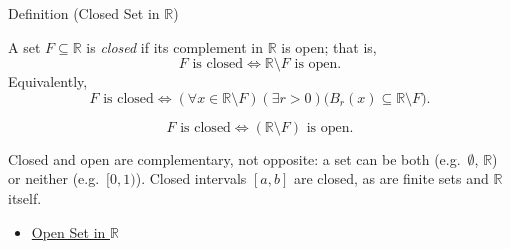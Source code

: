 \begin{definitionbox}{Definition (Closed Set in $\mathbb{R}$)}
\begin{definition}
\label{def:closed-set}
A set $F\subseteq\mathbb{R}$ is \emph{closed} if its complement in
$\mathbb{R}$ is open; that is,
\[
  F\text{ is closed}
  \Longleftrightarrow
  \mathbb{R}\setminus F\text{ is open}.
\]
Equivalently,
\[
  F\text{ is closed}
  \Longleftrightarrow
  (\forall x\in\mathbb{R}\setminus F)(\exists r>0)
  \bigl(B_r(x)\subseteq\mathbb{R}\setminus F\bigr).
\]
\end{definition}
\end{definitionbox}
\begin{remark*}
\[
F \text{ is closed} \Longleftrightarrow (\mathbb{R}\setminus F) \text{ is open}.
\]
\end{remark*}
\begin{remark*}[Interpretation]
Closed and open are complementary, not opposite: a set can be both (e.g.\ $\emptyset$, $\mathbb{R}$) or neither (e.g.\ $[0,1)$). Closed intervals $[a,b]$ are closed, as are finite sets and $\mathbb{R}$ itself.
\end{remark*}
\begin{dependencies}
\begin{itemize}
  \item \hyperref[def:open-set]{Open Set in $\mathbb{R}$}
\end{itemize}
\end{dependencies}
